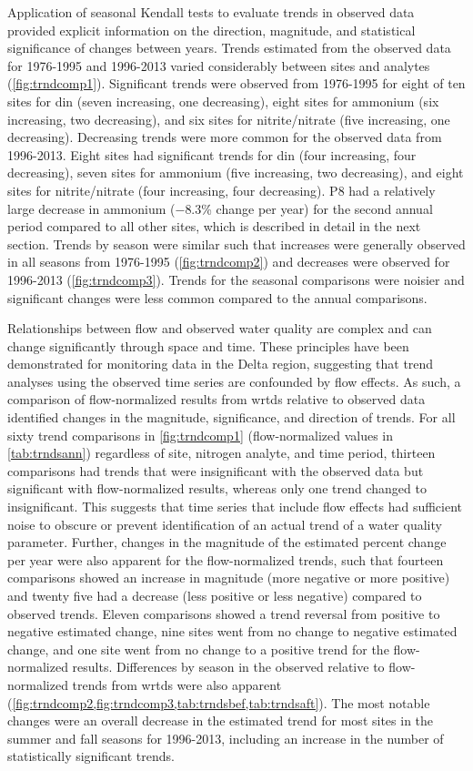 \documentclass[journal = esthag, manuscript = article]{achemso}\usepackage[]{graphicx}\usepackage[]{color}
\begin{document}
Application of seasonal Kendall tests to evaluate trends in observed data provided explicit information on the direction, magnitude, and statistical significance of changes between years. Trends estimated from the observed data for 1976-1995 and 1996-2013 varied considerably between sites and analytes (\cref{fig:trndcomp1}). Significant trends were observed from 1976-1995 for eight of ten sites for \ac{din} (seven increasing, one decreasing), eight sites for ammonium (six increasing, two decreasing), and six sites for nitrite/nitrate (five increasing, one decreasing).  Decreasing trends were more common for the observed data from 1996-2013.  Eight sites had significant trends for \ac{din} (four increasing, four decreasing), seven sites for ammonium (five increasing, two decreasing), and eight sites for nitrite/nitrate (four increasing, four decreasing). P8 had a relatively large decrease in ammonium ($-8.3$\% change per year) for the second annual period compared to all other sites, which is described in detail in the next section. Trends by season were similar such that increases were generally observed in all seasons from 1976-1995 (\cref{fig:trndcomp2}) and decreases were observed for 1996-2013 (\cref{fig:trndcomp3}).  Trends for the seasonal comparisons were noisier and significant changes were less common compared to the annual comparisons.


Relationships between flow and observed water quality are complex and can change significantly through space and time\cite{Hirsch10,Zhang16}. These principles have been demonstrated for monitoring data in the Delta region\cite{Jassby08,Novick15,Jabusch16}, suggesting that trend analyses using the observed time series are confounded by flow effects. As such, a comparison of flow-normalized results from \ac{wrtds} relative to observed data identified changes in the magnitude, significance, and direction of trends. For all sixty trend comparisons in \cref{fig:trndcomp1} (flow-normalized values in \cref{tab:trndsann}) regardless of site, nitrogen analyte, and time period, thirteen comparisons had trends that were insignificant with the observed data but significant with flow-normalized results, whereas only one trend changed to insignificant. This suggests that time series that include flow effects had sufficient noise to obscure or prevent identification of an actual trend of a water quality parameter. Further, changes in the magnitude of the estimated percent change per year were also apparent for the flow-normalized trends, such that fourteen comparisons showed an increase in magnitude (more negative or more positive) and twenty five had a decrease (less positive or less negative) compared to observed trends.  Eleven comparisons showed a trend reversal from positive to negative estimated change, nine sites went from no change to negative estimated change, and one site went from no change to a positive trend for the flow-normalized results. Differences by season in the observed relative to flow-normalized trends from \ac{wrtds} were also apparent (\cref{fig:trndcomp2,fig:trndcomp3,tab:trndsbef,tab:trndsaft}).  The most notable changes were an overall decrease in the estimated trend for most sites in the summer and fall seasons for 1996-2013, including an increase in the number of statistically significant trends.
\end{document}
